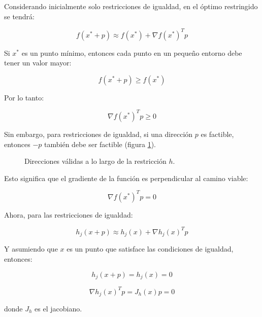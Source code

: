 Considerando inicialmente solo restricciones de igualdad, en el óptimo
restringido se tendrá:

\begin{equation}
	f(x^* + p) \approx f(x^*) + \nabla f(x^*)^T p
\end{equation}

Si $x^*$ es un punto mínimo, entonces cada punto en un pequeño entorno debe
tener un valor mayor:

\begin{equation}
	f(x^* + p) \geq f(x^*)
\end{equation}

Por lo tanto:

\begin{equation}
	\nabla f(x^*)^T p \geq 0
\end{equation}

Sin embargo, para restricciones de igualdad, si una dirección $p$ es factible,
entonces $-p$ también debe ser factible (figura \ref{fig:constraint_direction}).

\begin{figure}[h] \centering
	\centering
	
	\caption{Direcciones válidas a lo largo de la restricción $h$.}
	\label{fig:constraint_direction}
\end{figure}

Esto significa que el gradiente de la función es perpendicular al camino
viable:

\begin{equation} \label{eq:objective_gradient_perpendicular_to_direction_p}
	\nabla f(x^*)^T p = 0
\end{equation}

Ahora, para las restricciones de igualdad:

\begin{equation}
	h_j(x + p) \approx h_j(x) + \nabla h_j(x)^T p
\end{equation}

Y asumiendo que $x$ es un punto que satisface las condiciones de igualdad,
entonces:

\begin{equation}
	h_j(x + p) = h_j(x) = 0
\end{equation}

\begin{equation}
	\nabla h_j(x)^T p = J_h(x) p = 0
\end{equation}

donde $J_h$ es el jacobiano.

